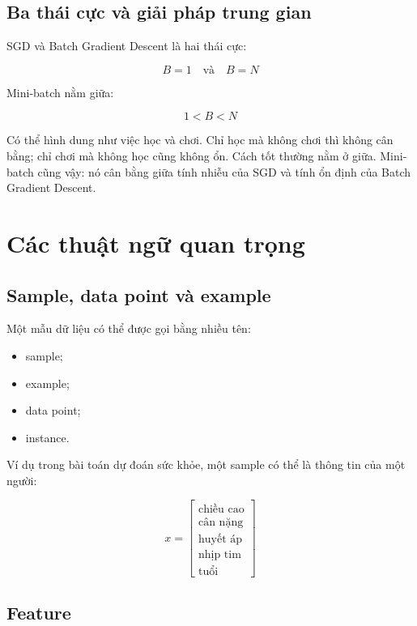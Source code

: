 \subsection{Ba thái cực và giải pháp trung gian}

SGD và Batch Gradient Descent là hai thái cực:

\[
    B=1
    \quad \text{và} \quad
    B=N
\]

Mini-batch nằm giữa:

\[
    1 < B < N
\]

\begin{vidu}
Có thể hình dung như việc học và chơi. Chỉ học mà không chơi thì không cân bằng; chỉ chơi mà không học cũng không ổn. Cách tốt thường nằm ở giữa. Mini-batch cũng vậy: nó cân bằng giữa tính nhiễu của SGD và tính ổn định của Batch Gradient Descent.
\end{vidu}

\section{Các thuật ngữ quan trọng}

\subsection{Sample, data point và example}

Một mẫu dữ liệu có thể được gọi bằng nhiều tên:

\begin{itemize}
    \item sample;
    \item example;
    \item data point;
    \item instance.
\end{itemize}

Ví dụ trong bài toán dự đoán sức khỏe, một sample có thể là thông tin của một người:

\[
    x =
    \begin{bmatrix}
    \text{chiều cao}\\
    \text{cân nặng}\\
    \text{huyết áp}\\
    \text{nhịp tim}\\
    \text{tuổi}
    \end{bmatrix}
\]

\subsection{Feature}

